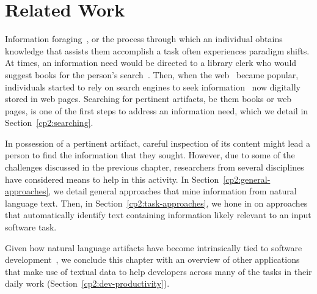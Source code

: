 \setcounter{chapter}{1}


\chapter{Related Work}
\label{ch:related-work}


Information foraging~\cite{Pirolli1999}, or the process through which an individual 
obtains knowledge that assists them accomplish a task often experiences paradigm shifts. 
At times, 
an information need would be directed to a library clerk who would suggest books for the person's search~\cite{saracevic1975}.
Then, when the \acf{web}~\cite{berners1994web} became popular,
individuals started to rely on search engines 
to seek information~\cite{Page1999} now digitally stored in web pages.
Searching for pertinent artifacts, be them books or web pages, 
is one of the first steps to address an information need,
which we detail in Section~\ref{cp2:searching}.


In possession of a pertinent artifact, careful 
inspection of its content might lead a person 
to find the information that they sought. 
However, due to some of the challenges
discussed in the previous chapter, researchers from several 
disciplines have considered means to help 
in this activity. 
In Section~\ref{cp2:general-approaches}, 
we detail general approaches that mine information
from natural language text. 
Then, in Section~\ref{cp2:task-approaches}, 
we hone in on approaches that
automatically identify text 
containing information likely relevant to an input software task.




Given how 
natural language artifacts have become intrinsically
tied to software development~\cite{umarji2008archetypal},
we conclude this chapter with an overview of 
other applications that make use of textual data
to help developers
across many of the tasks in their daily work (Section~\ref{cp2:dev-productivity}).



